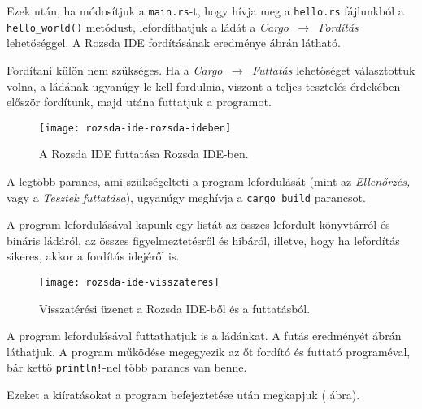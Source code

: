 Ezek után, ha módosítjuk a \texttt{main.rs}-t, hogy hívja meg a
\texttt{hello.rs} fájlunkból a \texttt{hello\_world()} metódust,
lefordíthatjuk a ládát a \textit{Cargo $\,\to\,$ Fordítás} lehetőséggel.
A Rozsda IDE fordításának eredménye  ábrán látható.

Fordítani külön nem szükséges.
Ha a \textit{Cargo $\,\to\,$ Futtatás} lehetőséget választottuk volna,
a ládának ugyanúgy le kell fordulnia, viszont a teljes tesztelés érdekében
először fordítunk, majd utána futtatjuk a programot.

\begin{figure}[h]
    \centering
    \texttt{[image: rozsda-ide-rozsda-ideben]}
    \caption{A Rozsda IDE futtatása Rozsda IDE-ben.}
    \label{fig:rozsda-ide-magaban}
\end{figure}

A legtöbb parancs, ami szükségelteti a program lefordulását (mint az \textit{Ellenőrzés,}
vagy a \textit{Tesztek futtatása}), ugyanúgy meghívja a \texttt{cargo build} parancsot.

A program lefordulásával kapunk egy listát az összes lefordult könyvtárról és bináris ládáról,
az összes figyelmeztetésről és hibáról, illetve, hogy ha lefordítás sikeres,
akkor a fordítás idejéről is.

\begin{figure}[h]
    \centering
    \texttt{[image: rozsda-ide-visszateres]}
    \caption{Visszatérési üzenet a Rozsda IDE-ből és a futtatásból.}
    \label{fig:visszateres}
\end{figure}

A program lefordulásával futtathatjuk is a ládánkat.
A futás eredményét  ábrán láthatjuk.
A program működése megegyezik az őt fordító és futtató programéval, bár kettő
\texttt{println!}-nel több parancs van benne.

Ezeket a kiíratásokat a program befejeztetése után megkapjuk ( ábra).
